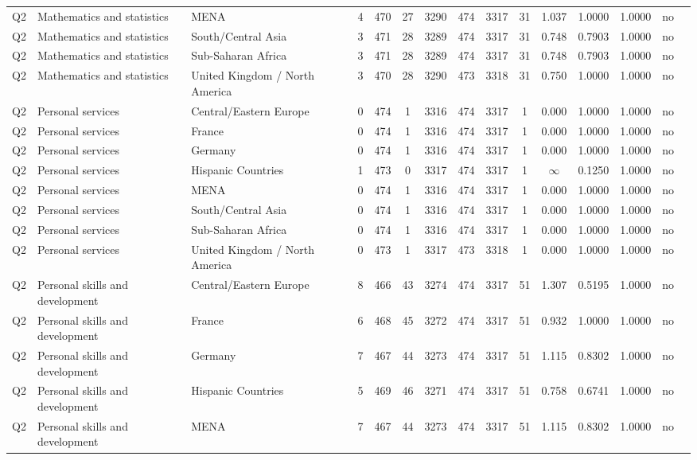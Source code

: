 \begin{longtable}{lllrcccccccccll}
Q2 & Mathematics and statistics & MENA & 4 & 470 & 27 & 3290 & 474 & 3317 & 31 & 1.037 & 1.0000 & 1.0000 & no \\
Q2 & Mathematics and statistics & South/Central Asia & 3 & 471 & 28 & 3289 & 474 & 3317 & 31 & 0.748 & 0.7903 & 1.0000 & no \\
Q2 & Mathematics and statistics & Sub-Saharan Africa & 3 & 471 & 28 & 3289 & 474 & 3317 & 31 & 0.748 & 0.7903 & 1.0000 & no \\
Q2 & Mathematics and statistics & United Kingdom / North America & 3 & 470 & 28 & 3290 & 473 & 3318 & 31 & 0.750 & 1.0000 & 1.0000 & no \\
Q2 & Personal services & Central/Eastern Europe & 0 & 474 & 1 & 3316 & 474 & 3317 & 1 & 0.000 & 1.0000 & 1.0000 & no \\
Q2 & Personal services & France & 0 & 474 & 1 & 3316 & 474 & 3317 & 1 & 0.000 & 1.0000 & 1.0000 & no \\
Q2 & Personal services & Germany & 0 & 474 & 1 & 3316 & 474 & 3317 & 1 & 0.000 & 1.0000 & 1.0000 & no \\
Q2 & Personal services & Hispanic Countries & 1 & 473 & 0 & 3317 & 474 & 3317 & 1 & $\infty$ & 0.1250 & 1.0000 & no \\
Q2 & Personal services & MENA & 0 & 474 & 1 & 3316 & 474 & 3317 & 1 & 0.000 & 1.0000 & 1.0000 & no \\
Q2 & Personal services & South/Central Asia & 0 & 474 & 1 & 3316 & 474 & 3317 & 1 & 0.000 & 1.0000 & 1.0000 & no \\
Q2 & Personal services & Sub-Saharan Africa & 0 & 474 & 1 & 3316 & 474 & 3317 & 1 & 0.000 & 1.0000 & 1.0000 & no \\
Q2 & Personal services & United Kingdom / North America & 0 & 473 & 1 & 3317 & 473 & 3318 & 1 & 0.000 & 1.0000 & 1.0000 & no \\
Q2 & Personal skills and development & Central/Eastern Europe & 8 & 466 & 43 & 3274 & 474 & 3317 & 51 & 1.307 & 0.5195 & 1.0000 & no \\
Q2 & Personal skills and development & France & 6 & 468 & 45 & 3272 & 474 & 3317 & 51 & 0.932 & 1.0000 & 1.0000 & no \\
Q2 & Personal skills and development & Germany & 7 & 467 & 44 & 3273 & 474 & 3317 & 51 & 1.115 & 0.8302 & 1.0000 & no \\
Q2 & Personal skills and development & Hispanic Countries & 5 & 469 & 46 & 3271 & 474 & 3317 & 51 & 0.758 & 0.6741 & 1.0000 & no \\
Q2 & Personal skills and development & MENA & 7 & 467 & 44 & 3273 & 474 & 3317 & 51 & 1.115 & 0.8302 & 1.0000 & no \\

\end{longtable}
